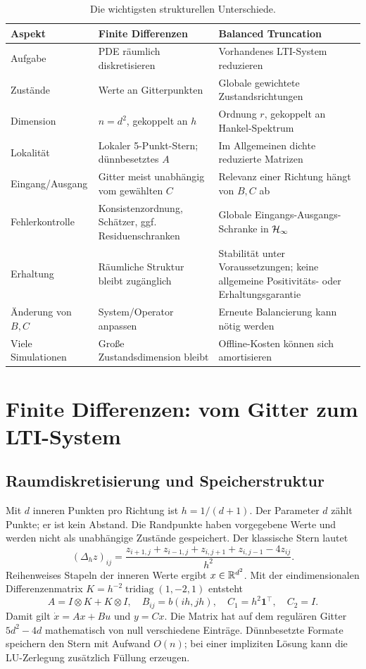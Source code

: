 \begin{table}[htbp]\centering\small
\caption{Die wichtigsten strukturellen Unterschiede.}
\begin{tabularx}{\linewidth}{>{\raggedright\arraybackslash}p{30mm}>{\raggedright\arraybackslash}X>{\raggedright\arraybackslash}X}\toprule
Aspekt & Finite Differenzen & Balanced Truncation\\\midrule
Aufgabe & PDE räumlich diskretisieren & Vorhandenes LTI-System reduzieren\\
Zustände & Werte an Gitterpunkten & Globale gewichtete Zustandsrichtungen\\
Dimension & $n=d^2$, gekoppelt an $h$ & Ordnung $r$, gekoppelt an Hankel-Spektrum\\
Lokalität & Lokaler 5-Punkt-Stern; dünnbesetztes $A$ & Im Allgemeinen dichte reduzierte Matrizen\\
Eingang/Ausgang & Gitter meist unabhängig vom gewählten $C$ & Relevanz einer Richtung hängt von $B,C$ ab\\
Fehlerkontrolle & Konsistenzordnung, Schätzer, ggf. Residuenschranken & Globale Eingangs-Ausgangs-Schranke in $\mathcal{H}_\infty$\\
Erhaltung & Räumliche Struktur bleibt zugänglich & Stabilität unter Voraussetzungen; keine allgemeine Positivitäts- oder Erhaltungsgarantie\\
Änderung von $B,C$ & System/Operator anpassen & Erneute Balancierung kann nötig werden\\
Viele Simulationen & Große Zustandsdimension bleibt & Offline-Kosten können sich amortisieren\\\bottomrule
\end{tabularx}
\end{table}

\section{Finite Differenzen: vom Gitter zum LTI-System}
\subsection{Raumdiskretisierung und Speicherstruktur}
Mit $d$ inneren Punkten pro Richtung ist $h=1/(d+1)$. Der Parameter $d$ zählt Punkte; er ist kein Abstand. Die Randpunkte haben vorgegebene Werte und werden nicht als unabhängige Zustände gespeichert. Der klassische Stern lautet
\begin{equation}
 (\Delta_h z)_{ij}=\frac{z_{i+1,j}+z_{i-1,j}+z_{i,j+1}+z_{i,j-1}-4z_{ij}}{h^2}.
\end{equation}
Reihenweises Stapeln der inneren Werte ergibt $x\in\mathbb{R}^{d^2}$. Mit der eindimensionalen Differenzenmatrix $K=h^{-2}\operatorname{tridiag}(1,-2,1)$ entsteht
\begin{equation}
 A=I\otimes K+K\otimes I,\quad B_{ij}=b(ih,jh),\quad
 C_1=h^2\mathbf 1^\top,\quad C_2=I.
\end{equation}
Damit gilt $\dot x=Ax+Bu$ und $y=Cx$. Die Matrix hat auf dem regulären Gitter $5d^2-4d$ mathematisch von null verschiedene Einträge. Dünnbesetzte Formate speichern den Stern mit Aufwand $O(n)$; bei einer impliziten Lösung kann die LU-Zerlegung zusätzlich Füllung erzeugen.

